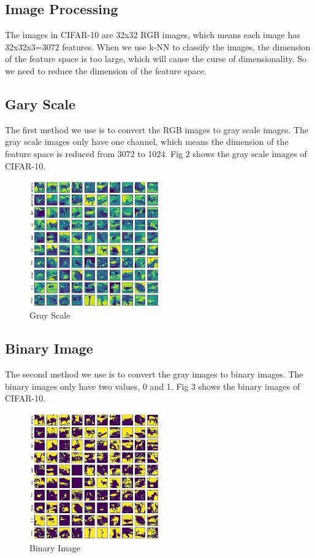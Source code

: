 \documentclass[11pt]{article}
\begin{document}
\subsection{Image Processing}
The images in CIFAR-10 are 32x32 RGB images, which means each image has 32x32x3=3072 features. When we use k-NN to classify the images, the dimension of the feature space is too large, which will cause the curse of dimensionality. So we need to reduce the dimension of the feature space.

\subsection{Gary Scale}
The first method we use is to convert the RGB images to gray scale images. The gray scale images only have one channel, which means the dimension of the feature space is reduced from 3072 to 1024.
Fig 2 shows the gray scale images of CIFAR-10.
\begin{figure}[h]
    \centering
    \includegraphics[width=0.5\textwidth]{gray.png}
    \caption{Gray Scale}
    \label{fig:gray}
\end{figure}
\subsection{Binary Image}

The second method we use is to convert the gray images to binary images. The binary images only have two values, 0 and 1.
Fig 3 shows the binary images of CIFAR-10.
\begin{figure}[h]
    \centering
    \includegraphics[width=0.5\textwidth]{binary.png}
    \caption{Binary Image}
    \label{fig:binary}
\end{figure}
\end{document}
